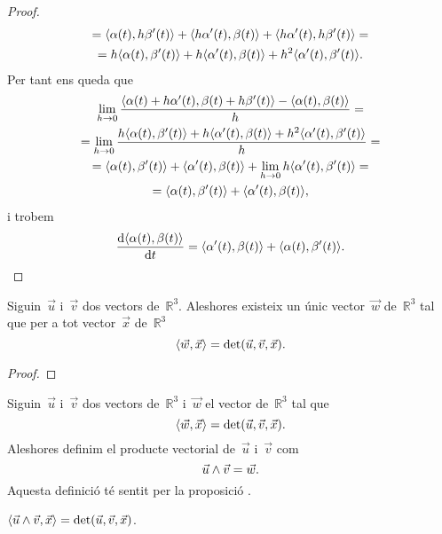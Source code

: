 \documentclass[../../main.tex]{subfiles}
\begin{document}
\begin{proposition}
\begin{proof}
\begin{multline*}
				=\prodesc{\alpha(t)}{h\beta'(t)}+\prodesc{h\alpha'(t)}{\beta(t)}+\prodesc{h\alpha'(t)}{h\beta'(t)}=\\
				=h\prodesc{\alpha(t)}{\beta'(t)}+h\prodesc{\alpha'(t)}{\beta(t)}+h^{2}\prodesc{\alpha'(t)}{\beta'(t)}.
			\end{multline*}
			Per tant ens queda que
			\begin{multline*}
				\lim_{h\to0}\frac{\prodesc{\alpha(t)+h\alpha'(t)}{\beta(t)+h\beta'(t)}-\prodesc{\alpha(t)}{\beta(t)}}{h}=\\
				=\lim_{h\to0}\frac{h\prodesc{\alpha(t)}{\beta'(t)}+h\prodesc{\alpha'(t)}{\beta(t)}+h^{2}\prodesc{\alpha'(t)}{\beta'(t)}}{h}=\\
				=\prodesc{\alpha(t)}{\beta'(t)}+\prodesc{\alpha'(t)}{\beta(t)}+\lim_{h\to0}h\prodesc{\alpha'(t)}{\beta'(t)}=\\
				=\prodesc{\alpha(t)}{\beta'(t)}+\prodesc{\alpha'(t)}{\beta(t)},
			\end{multline*}
			i trobem
			\[
			    \frac{\diff\prodesc{\alpha(t)}{\beta(t)}}{\diff t}=\prodesc{\alpha'(t)}{\beta(t)}+\prodesc{\alpha(t)}{\beta'(t)}.\qedhere
			\]
		\end{proof}
	\end{proposition}
	\begin{proposition}
		\label{prop:unicitat del producte vectorial entre dos vectors}
		Siguin~\(\vec{u}\) i~\(\vec{v}\) dos vectors de~\(\mathbb{R}^{3}\).
		Aleshores existeix un únic vector~\(\vec{w}\) de~\(\mathbb{R}^{3}\) tal que per a tot vector~\(\vec{x}\) de~\(\mathbb{R}^{3}\)
		\[
		    \prodesc{\vec{w}}{\vec{x}}=\det(\vec{u},\vec{v},\vec{x}).
		\]
		\begin{proof}
		\end{proof}
	\end{proposition}
	\begin{definition}
		\label{def:producte vectorial}
		Siguin~\(\vec{u}\) i~\(\vec{v}\) dos vectors de~\(\mathbb{R}^{3}\) i~\(\vec{w}\) el vector de~\(\mathbb{R}^{3}\) tal que
		\[
		    \prodesc{\vec{w}}{\vec{x}}=\det(\vec{u},\vec{v},\vec{x}).
		\]
		Aleshores definim el producte vectorial de~\(\vec{u}\) i~\(\vec{v}\) com
		\[
		    \vec{u}\mathbin{\wedge}\vec{v}=\vec{w}.
		\]
		Aquesta definició té sentit per la proposició .
	\end{definition}
	\begin{observation}
		\label{obs:fórmula del determinant segons el producte vectorial i el producte escalar}
		\(\prodesc{\vec{u}\prodvec\vec{v}}{\vec{x}}=\det(\vec{u},\vec{v},\vec{x})\).
	\end{observation}
\end{document}
